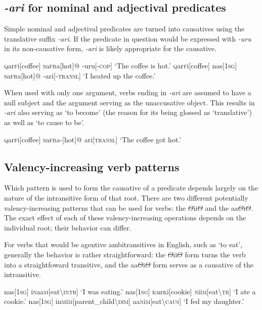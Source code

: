 \documentclass[a4paper,10pt,twoside,openright]{memoir}
\newcommand{\rootpart}{$\Theta$}
\newcommand{\famwordold}[5]{#1\textsc{#2}#3\textsc{#4}#5}
\begin{document}
\subsection{\textit{-ari} for nominal and adjectival predicates}

Simple nominal and adjectival predicates are turned into causatives using the translative suffix \textit{-ari}. If the predicate in question would be expressed with \textit{-uru} in its non-causative form, \textit{-ari} is likely appropriate for the causative.

\pex
\a
\begingl
\famwordold{}{q}{ar}{f}{i}[coffee]
\famwordold{}{s}{a}{fr}{a}[hot]@
-uru[\textsc{-cop}]
\glft `The coffee is hot.'
\endgl
\a
\begingl
\famwordold{}{q}{ar}{f}{i}[coffee]
nas[\textsc{1sg}]
\famwordold{}{s}{a}{fr}{a}[hot]@
-ari[-\textsc{transl}]
\glft `I heated up the coffee.'
\endgl
\xe

When used with only one argument, verbs ending in \textit{-ari} are assumed to have a null subject and the argument serving as the unaccusative object. This results in \textit{-ari} also serving as `to become' (the reason for its being glossed as `translative') as well as `to cause to be'.

\ex
\begingl
\famwordold{}{q}{ar}{f}{i}[coffee]
\famwordold{}{s}{a}{fr}{a}-[hot]@
ari[\textsc{transl}]
\glft `The coffee got hot.'
\endgl
\xe

\subsection{Valency-increasing verb patterns}

Which pattern is used to form the causative of a predicate depends largely on the nature of the intransitive form of that root. There are two different potentially valency-increasing patterns that can be used for verbs: the {\rootpart}ii{\rootpart} and the aa{\rootpart}i{\rootpart}. The exact effect of each of these valency-increasing operations depends on the individual root; their behavior can differ.

For verbs that would be agentive ambitransitives in English, such as `to eat', generally the behavior is rather straightforward: the {\rootpart}ii{\rootpart} form turns the verb into a straightfoward transitive, and the aa{\rootpart}i{\rootpart} form serves as a causative of the intransitive. 

\pex
\a
\begingl
nas[\textsc{1sg}]
\famwordold{i}{n}{aa}{m}{}[eat\textbackslash\textsc{intr}]
\glft `I was eating.'
\endgl
\a
\begingl
nas[\textsc{1sg}]
\famwordold{}{k}{ur}{k}{i}[cookie]
\famwordold{}{n}{ii}{m}{}[eat\textbackslash\textsc{tr}]
\glft `I ate a cookie.'
\endgl
\a
\begingl
nas[\textsc{1sg}]
\famwordold{in}{m}{i}{m}{}[parent\_child\textbackslash\textsc{dim}]
\famwordold{aa}{n}{i}{m}{}[eat\textbackslash\textsc{caus}]
\glft `I fed my daughter.'
\endgl
\xe
\end{document}
